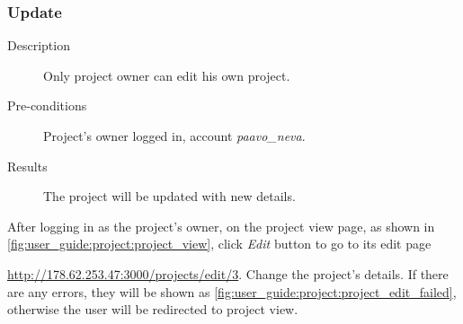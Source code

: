 \clearpage

\subsubsection{Update}
\label{ch:result:user_guide:project:update}

\begin{description}
\item[Description] Only project owner can edit his own project.
\item[Pre-conditions] Project's owner logged in, \eg account \emph{paavo\_neva}.
\item[Results] The project will be updated with new details.
\end{description}

After logging in as the project's owner, on the project view page, as shown in \autoref{fig:user_guide:project:project_view}, click \emph{Edit} button to go to its edit page 

\noindent\href{http://178.62.253.47:3000/projects/edit/3}{http://178.62.253.47:3000/projects/edit/3}.
Change the project's details.
If there are any errors, they will be shown as \autoref{fig:user_guide:project:project_edit_failed}, otherwise the user will be redirected to project view.


